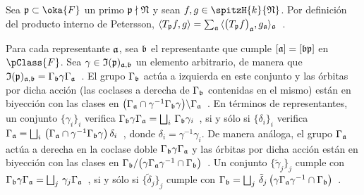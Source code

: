 Sea $\frak{p}\subset\oka{F}$ un primo $\frak{p}\nmid\frak{N}$ y sean
$f,g\in\spitzH{k}{\frak{N}}$. Por definici\'{o}n del producto interno de
Petersson,
\begin{math}
	\langle T_{\frak{p}}f,g\rangle=\sum_{\frak{a}}\,
		\langle\big(T_{\frak{p}}f\big)_{\frak{a}},g_{\frak{a}}
			\rangle_{\frak{a}}
\end{math}~.

Para cada representante $\frak{a}$, sea $\frak{b}$ el representante que cumple
$[\frak{a}]=[\frak{b}\frak{p}]$ en $\pClass{F}$. Sea
$\gamma\in\frak{I}(\frak{p})_{\frak{a},\frak{b}}$ un elemento arbitrario, de
manera que
\begin{math}
	\frak{I}(\frak{p})_{\frak{a},\frak{b}}=
		\Gamma_{\frak{b}}\gamma\Gamma_{\frak{a}}
\end{math}~.
El grupo $\Gamma_{\frak{b}}$ act\'{u}a a izquierda en este conjunto y las
\'{o}rbitas por dicha acci\'{o}n (las coclases a derecha de $\Gamma_{\frak{b}}$
contenidas en el mismo) est\'{a}n en biyecci\'{o}n con las clases en
\begin{math}
	\big(\Gamma_{\frak{a}}\cap\gamma^{-1}\Gamma_{\frak{b}}\gamma\big)
		\backslash\Gamma_{\frak{a}}
\end{math}~.
En t\'{e}rminos de representantes, un conjunto $\{\gamma_{i}\}_{i}$ verifica
\begin{math}
	\Gamma_{\frak{b}}\gamma\Gamma_{\frak{a}}=
		\bigsqcup_{i}\,\Gamma_{\frak{b}}\gamma_{i}
\end{math}~,
si y s\'{o}lo si $\{\delta_{i}\}_{i}$ verifica
\begin{math}
	\Gamma_{\frak{a}}=\bigsqcup_{i}\,\big(\Gamma_{\frak{a}}\cap
		\gamma^{-1}\Gamma_{\frak{b}}\gamma\big)\,\delta_{i}
\end{math}~,
donde $\delta_{i}=\gamma^{-1}\gamma_{i}$. De manera an\'{a}loga, el grupo
$\Gamma_{\frak{a}}$ act\'{u}a a derecha en la coclase doble
$\Gamma_{\frak{b}}\gamma\Gamma_{\frak{a}}$ y las \'{o}rbitas por dicha
acci\'{o}n est\'{a}n en biyecci\'{o}n con las clases en
\begin{math}
	\Gamma_{\frak{b}}/\big(\gamma\Gamma_{\frak{a}}\gamma^{-1}\cap
		\Gamma_{\frak{b}}\big)
\end{math}~.
Un conjunto $\{\tilde{\gamma}_{j}\}_{j}$ cumple con
\begin{math}
	\Gamma_{\frak{b}}\gamma\Gamma_{\frak{a}}=
		\bigsqcup_{j}\,\gamma_{j}\Gamma_{\frak{a}}
\end{math}~,
si y s\'{o}lo si $\{\tilde{\delta}_{j}\}_{j}$ cumple con
\begin{math}
	\Gamma_{\frak{b}}=\bigsqcup_{j}\,\tilde{\delta}_{j}\,\big(
		\gamma\Gamma_{\frak{a}}\gamma^{-1}\cap\Gamma_{\frak{b}}\big)
\end{math}~.
